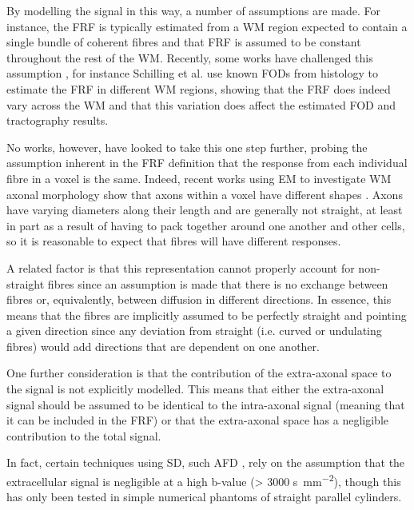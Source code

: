 By modelling the signal in this way, a number of assumptions are made. For instance, the \ac{FRF} is typically estimated from a \ac{WM} region expected to contain a single bundle of coherent fibres and that \ac{FRF} is assumed to be constant throughout the rest of the \ac{WM}.
Recently, some works have challenged this assumption \cite{Novikov2019,Schilling2019,Christiaens2020}, for instance Schilling et al. \cite{Schilling2019} use known \acs{FOD}s from histology to estimate the \ac{FRF} in different WM regions, showing that the \ac{FRF} does indeed vary across the \ac{WM} and that this variation does affect the estimated \ac{FOD} and tractography results.

No works, however, have looked to take this one step further, probing the assumption inherent in the \ac{FRF} definition that the response from each individual fibre in a voxel is the same.
Indeed, recent works using \ac{EM} to investigate \ac{WM} axonal morphology show that axons within a voxel have different shapes \cite{Lee2019b,Abdollahzadeh2019}. Axons have varying diameters along their length and are generally not straight, at least in part as a result of having to pack together around one another and other cells, so it is reasonable to expect that fibres will have different responses. 

A related factor is that this representation cannot properly account for non-straight fibres since an assumption is made that there is no exchange between fibres or, equivalently, between diffusion in different directions. In essence, this means that the fibres are implicitly assumed to be perfectly straight and pointing a given direction since any deviation from straight (i.e. curved or undulating fibres) would add directions that are dependent on one another.

One further consideration is that the contribution of the extra-axonal space to the signal is not explicitly modelled. This means that either the extra-axonal signal should be assumed to be identical to the intra-axonal signal (meaning that it can be included in the \ac{FRF}) or that the extra-axonal space has a negligible contribution to the total signal.

In fact, certain techniques using \ac{SD}, such \ac{AFD} \cite{Raffelt2012}, rely on the assumption that the extracellular signal is negligible at a high b-value (> 3000 \si{\second\per\milli\metre\squared}), though this has only been tested in simple numerical phantoms of straight parallel cylinders.

